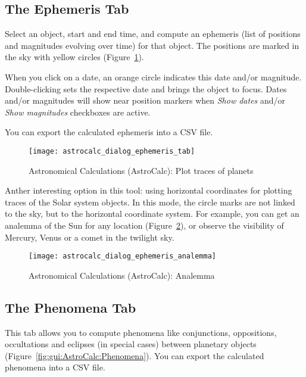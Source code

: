 \subsection{The Ephemeris Tab}
\label{sec:gui:AstroCalc:Ephemeris}

Select an object, start and end time, and compute an ephemeris (list of positions and magnitudes evolving over time) for that object. 
The positions are marked in the sky with yellow circles (Figure~\ref{fig:gui:AstroCalc:Ephemeris}). 

When you click on a date, an orange circle indicates this date and/or magnitude. 
Double-clicking sets the respective date and brings the object to focus. 
Dates and/or magnitudes will show near position markers when \emph{Show dates} and/or \emph{Show magnitudes} checkboxes are active.

You can export the calculated ephemeris into a CSV file. 

\begin{figure}[htbp]
\centering\texttt{[image: astrocalc\_dialog\_ephemeris\_tab]}
\caption{Astronomical Calculations (AstroCalc): Plot traces of planets}
\label{fig:gui:AstroCalc:Ephemeris}
\end{figure}

Anther interesting option in this tool: using horizontal coordinates for plotting traces of the Solar system objects. 
In this mode, the circle marks are not linked to the sky, but to the horizontal coordinate system.
For example, you can get an analemma of the Sun for any location (Figure~\ref{fig:gui:AstroCalc:Ephemeris:Analemma}), 
or observe the visibility of Mercury, Venus or a comet in the twilight sky.

\begin{figure}[htbp]
\centering\texttt{[image: astrocalc\_dialog\_ephemeris\_analemma]}
\caption{Astronomical Calculations (AstroCalc): Analemma}
\label{fig:gui:AstroCalc:Ephemeris:Analemma}
\end{figure}

\newpage
\subsection{The Phenomena Tab}
\label{sec:gui:AstroCalc:Phenomena}

This tab allows you to compute phenomena like conjunctions, oppositions, 
occultations and eclipses (in special cases) between planetary objects 
(Figure~\ref{fig:gui:AstroCalc:Phenomena}). 
You can export the calculated phenomena into a CSV file.

